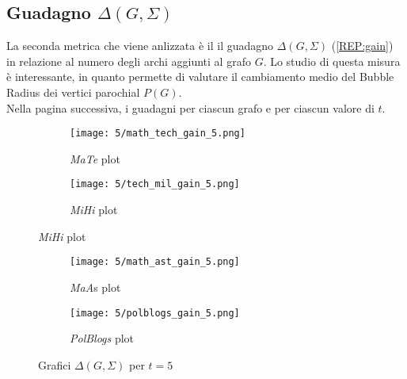 \subsection{Guadagno $\Delta(G,\Sigma)$}
La seconda metrica che viene anlizzata è il il guadagno $\Delta(G,\Sigma)$ (\ref{REP:gain}) in relazione al numero 
degli archi aggiunti al grafo $G$. Lo studio di questa misura è interessante, in quanto permette di valutare il cambiamento medio del Bubble Radius dei vertici parochial $P(G)$.
\\
Nella pagina successiva, i guadagni per ciascun grafo e per ciascun valore di $t$.
\begin{figure}[!h]
    \centering
\begin{subfigure}[h]{0.4\textwidth}
    \centering
    \texttt{[image: 5/math\_tech\_gain\_5.png]}
    \caption{\emph{MaTe} plot}\label{fig:mate_g_5}
\end{subfigure}
\hspace{0.1\columnwidth}
\begin{subfigure}[h]{0.4\textwidth}
    \centering
    \texttt{[image: 5/tech\_mil\_gain\_5.png]}
    \caption{\emph{MiHi} plot}\label{fig:mihi_g_5}
\end{subfigure}
\end{figure}
\begin{figure}
    \ContinuedFloat
    \centering
\begin{subfigure}[h]{0.4\textwidth}
    \centering
    \texttt{[image: 5/math\_ast\_gain\_5.png]}
    \caption{\emph{MaA}s plot}\label{fig:maas_g_5}
\end{subfigure}
\hspace{0.1\columnwidth}
\begin{subfigure}[h]{0.4\textwidth}
    \centering
    \texttt{[image: 5/polblogs\_gain\_5.png]}
    \caption{\emph{PolBlogs} plot}\label{fig:polblogs_g_5}
\end{subfigure}
\caption{Grafici $\Delta(G,\Sigma)$ per $t=5$}
\end{figure}
